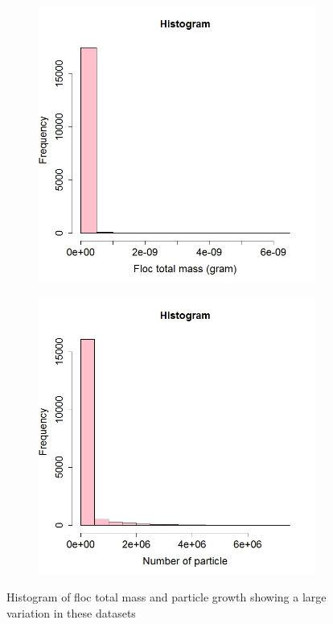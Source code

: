 \begin{figure}[!ht]
\begin{subfigure}[b]{.5\textwidth}
\includegraphics[width=.8\textwidth]{p2/hist_mass}
\end{subfigure}\hspace*{-1.5em}
\centering
\begin{subfigure}[b]{.50\textwidth}
\includegraphics[width=.8\textwidth]{p2/hist_nop}
\end{subfigure}\vspace*{-.5em}
\caption[]{Histogram of floc total mass and particle growth showing a large variation in these datasets}
\end{figure}\label{hist}


